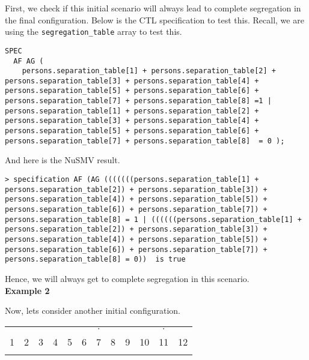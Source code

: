 \documentclass[../main.tex]{subfiles}
\begin{document}
First, we check if this initial scenario will always lead to complete segregation in the final configuration. Below is the CTL specification to test this. Recall, we are using the \verb|segregation_table| array to test this.

\begin{lstlisting}
SPEC
  AF AG ( 
    persons.separation_table[1] + persons.separation_table[2] + persons.separation_table[3] + persons.separation_table[4] + persons.separation_table[5] + persons.separation_table[6] + persons.separation_table[7] + persons.separation_table[8] =1 | persons.separation_table[1] + persons.separation_table[2] + persons.separation_table[3] + persons.separation_table[4] + persons.separation_table[5] + persons.separation_table[6] + persons.separation_table[7] + persons.separation_table[8]  = 0 );
\end{lstlisting}

And here is the NuSMV result.

\begin{lstlisting}
> specification AF (AG (((((((persons.separation_table[1] + persons.separation_table[2]) + persons.separation_table[3]) + persons.separation_table[4]) + persons.separation_table[5]) + persons.separation_table[6]) + persons.separation_table[7]) + persons.separation_table[8] = 1 | ((((((persons.separation_table[1] + persons.separation_table[2]) + persons.separation_table[3]) + persons.separation_table[4]) + persons.separation_table[5]) + persons.separation_table[6]) + persons.separation_table[7]) + persons.separation_table[8] = 0))  is true
\end{lstlisting}

Hence, we will always get to complete segregation in this scenario. \\

\textbf{Example 2}

Now, lets consider another initial configuration.

 \begin{table}[H]
\begin{center}
{\begin{tabular}{| c |c| c| c| c |c| c |c|c|c|c|c| }
\hline
 &  &  & & & & $\cdot$ & &  & &$\cdot$ &\\
1 & 2 &3 &4 & 5 &6  &7 &8 & 9& 10&11&12\\
\x&\x & \x &\z &\z &\z & \x &\z  &\x &\z &\x&\z \\
 \hline
\end{tabular}}
\end{center}
\end{table}
\end{document}
